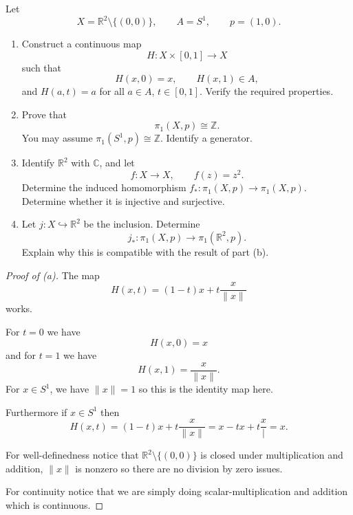 \documentclass[11pt]{article}
\begin{document}
\begin{prob*}
    Let
    \[
        X=\mathbb R^2\setminus\{(0,0)\},
        \qquad A=S^1,
        \qquad p=(1,0).
    \]

    \begin{enumerate}[label=\alph*)]
        \item Construct a continuous map
        \[
            H:X\times[0,1]\to X
        \]
        such that
        \[
            H(x,0)=x,\qquad H(x,1)\in A,
        \]
        and \(H(a,t)=a\) for all
        \(a\in A\), \(t\in[0,1]\).
        Verify the required properties.

        \item Prove that
        \[
            \pi_1(X,p)\cong\mathbb Z.
        \]
        You may assume
        \(\pi_1(S^1,p)\cong\mathbb Z\).
        Identify a generator.

        \item Identify \(\mathbb R^2\) with
        \(\mathbb C\), and let
        \[
            f:X\to X,\qquad f(z)=z^2.
        \]
        Determine the induced homomorphism
        \(f_*:\pi_1(X,p)\to\pi_1(X,p)\).
        Determine whether it is injective
        and surjective.

        \item Let \(j:X\hookrightarrow\mathbb R^2\)
        be the inclusion. Determine
        \[
            j_*:\pi_1(X,p)\to
            \pi_1(\mathbb R^2,p).
        \]
        Explain why this is compatible
        with the result of part (b).
    \end{enumerate}
\end{prob*}
\begin{proof}[Proof of (a)]
    The map 
    \[
        H(x,t) = (1-t)x + t \frac{x}{\|x\|}
    \]
    works. 

    For $t = 0$ we have 
    \[
        H(x,0) = x 
    \]
    and for $t = 1$ we have 
    \[
        H(x,1) 
        = \frac{x}{\|x\|}. 
    \]
    For $x \in S^1$, we have 
    $\|x\| = 1$ so this is the identity map here. 

    Furthermore if $x \in S^1$ then 
    \[
        H(x,t) = (1-t)x + t \frac{x}{\|x\|} 
        = x -tx + t\frac{x}{|} 
        = x. 
    \]

    For well-definedness notice that $\mathbb R^2 
    \setminus \{(0,0)\}$ is closed under multiplication 
    and addition, 
    $\|x\|$ is nonzero so there are no division by 
    zero issues.
    
    For continuity notice that we are 
    simply doing scalar-multiplication and 
    addition which is 
    continuous. 
\end{proof}
\end{document}
